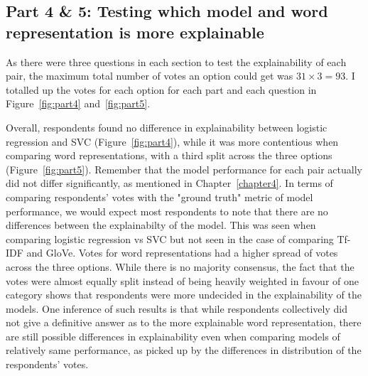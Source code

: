 \subsection{Part 4 \& 5: Testing which model and word representation is more explainable}
As there were three questions in each section to test the explainability of each pair, the maximum total number of votes an option could get was $31 \times 3 = 93$. I totalled up the votes for each option for each part and each question in Figure~\ref{fig:part4} and~\ref{fig:part5}.

Overall, respondents found no difference in explainability between logistic regression and SVC (Figure~\ref{fig:part4}), while it was more contentious when comparing word representations, with a third split across the three options (Figure~\ref{fig:part5}). Remember that the model performance for each pair actually did not differ significantly, as mentioned in Chapter~\ref{chapter4}. In terms of comparing respondents' votes with the "ground truth" metric of model performance, we would expect most respondents to note that there are no differences between the explainabilty of the model. This was seen when comparing logistic regression vs SVC but not seen in the case of comparing Tf-IDF and GloVe. Votes for word representations had a higher spread of votes across the three options. While there is no majority consensus, the fact that the votes were almost equally split instead of being heavily weighted in favour of one category shows that respondents were more undecided in the explainability of the models. One inference of such results is that while respondents collectively did not give a definitive answer as to the more explainable word representation, there are still possible differences in explainability even when comparing models of relatively same performance, as picked up by the differences in distribution of the respondents' votes.

